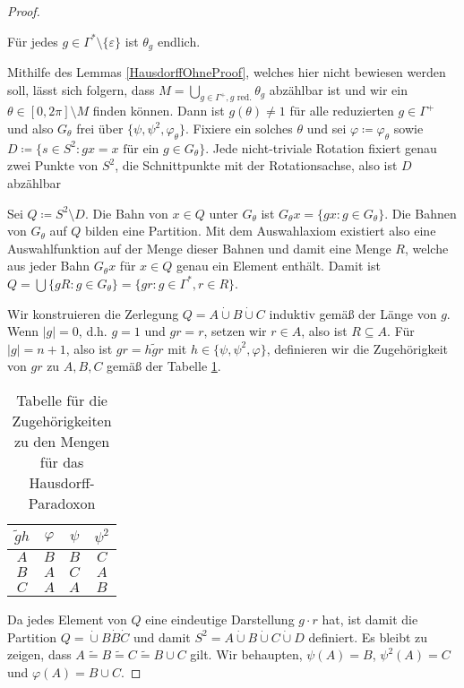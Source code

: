 \begin{proof}
	\begin{lemma}
		Für jedes $g\in\Gamma^\ast\setminus\{\varepsilon\}$ ist $\theta_g$ endlich.
		\label{HausdorffOhneProof}
	\end{lemma}

	Mithilfe des Lemmas \ref{HausdorffOhneProof}, welches hier nicht bewiesen werden soll, lässt sich folgern, dass $M=\bigcup\limits_{g\in\Gamma^+, g\text{ red.}}\theta_g$ abzählbar ist und wir ein $\theta\in [0,2\pi]\setminus M$ finden können. Dann ist $g(\theta)\neq 1$ für alle reduzierten $g\in\Gamma^+$ und also $G_\theta$ frei über $\{\psi,\psi^2,\varphi_\theta\}$. Fixiere ein solches $\theta$ und sei $\varphi\coloneqq\varphi_\theta$ sowie $D\coloneqq\{s\in S^2 : gx=x\text{ für ein } g\in G_\theta\}$. Jede nicht-triviale Rotation fixiert genau zwei Punkte von $S^2$, die Schnittpunkte mit der Rotationsachse, also ist $D$ abzählbar
	
	Sei $Q\coloneqq S^2\setminus D$. Die Bahn von $x\in Q$ unter $G_\theta$ ist $G_\theta x=\{gx : g\in G_\theta\}$. Die Bahnen von $G_\theta$ auf $Q$ bilden eine Partition. Mit dem Auswahlaxiom existiert also eine Auswahlfunktion auf der Menge dieser Bahnen und damit eine Menge $R$, welche aus jeder Bahn $G_\theta x$ für $x\in Q$ genau ein Element enthält. Damit ist $Q=\bigcup\{gR : g\in G_\theta\}=\{gr : g\in\Gamma^\ast,r\in R\}$.
	
	Wir konstruieren die Zerlegung $Q=A\dot{\cup} B \dot{\cup}C$ induktiv gemäß der Länge von $g$. Wenn $\vert g \vert=0$, d.h. $g=1$ und $gr=r$, setzen wir $r\in A$, also ist $R\subseteq A$. Für $\vert g \vert = n+1$, also ist $gr=h\tilde{g}r$ mit $h\in\{\psi,\psi^2,\varphi\}$, definieren wir die Zugehörigkeit von $gr$ zu $A,B,C$ gemäß der Tabelle \ref{HausdorffTabelle}.
	\begin{table}[h]
		\begin{center}
			\begin{tabular}{c|ccc}
				$\tilde{g}h$ & $\varphi$ & $\psi$ & $\psi^2$ \\
				\hline
				$A$ & $B$ & $B$ & $C$ \\
				$B$ & $A$ & $C$ & $A$ \\
				$C$ & $A$ & $A$ & $B$ \\
			\end{tabular}
		\end{center}
		\caption{Tabelle für die Zugehörigkeiten zu den Mengen für das Hausdorff-Paradoxon}
		\label{HausdorffTabelle}
	\end{table}

	Da jedes Element von $Q$ eine eindeutige Darstellung $g\cdot r$ hat, ist damit die Partition $Q=\dot{\cup}B\dot{B}\dot{C}$ und damit $S^2=A\dot{\cup}B\dot{\cup}C\dot{\cup}D$ definiert. Es bleibt zu zeigen, dass $A\widetilde{=}B\widetilde{=}C\widetilde{=}B\cup C$ gilt. Wir behaupten, $\psi(A)=B$, $\psi^2(A)=C$ und $\varphi(A)=B\cup C$.
	\par
	

\end{proof}
